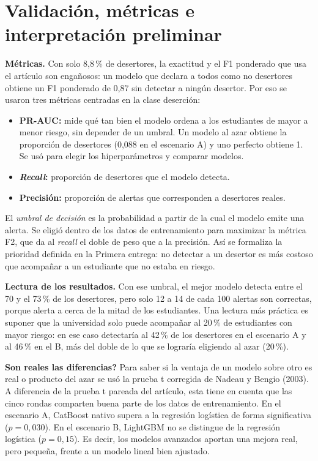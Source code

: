 \documentclass[11pt,a4paper]{article}
\begin{document}
\section{Validación, métricas e interpretación preliminar}

\textbf{Métricas.} Con solo 8,8\,\% de desertores, la exactitud y el F1 ponderado que usa el artículo son engañosos: un modelo que declara a todos como no desertores obtiene un F1 ponderado de 0,87 sin detectar a ningún desertor. Por eso se usaron tres métricas centradas en la clase deserción:
\begin{itemize}[leftmargin=1.2em,itemsep=1pt,topsep=2pt]
\item \textbf{PR-AUC:} mide qué tan bien el modelo ordena a los estudiantes de mayor a menor riesgo, sin depender de un umbral. Un modelo al azar obtiene la proporción de desertores (0,088 en el escenario A) y uno perfecto obtiene 1. Se usó para elegir los hiperparámetros y comparar modelos.
\item \textbf{\textit{Recall}:} proporción de desertores que el modelo detecta.
\item \textbf{Precisión:} proporción de alertas que corresponden a desertores reales.
\end{itemize}
El \emph{umbral de decisión} es la probabilidad a partir de la cual el modelo emite una alerta. Se eligió dentro de los datos de entrenamiento para maximizar la métrica F2, que da al \textit{recall} el doble de peso que a la precisión. Así se formaliza la prioridad definida en la Primera entrega: no detectar a un desertor es más costoso que acompañar a un estudiante que no estaba en riesgo.

\textbf{Lectura de los resultados.} Con ese umbral, el mejor modelo detecta entre el 70 y el 73\,\% de los desertores, pero solo 12 a 14 de cada 100 alertas son correctas, porque alerta a cerca de la mitad de los estudiantes. Una lectura más práctica es suponer que la universidad solo puede acompañar al 20\,\% de estudiantes con mayor riesgo: en ese caso detectaría al 42\,\% de los desertores en el escenario A y al 46\,\% en el B, más del doble de lo que se lograría eligiendo al azar (20\,\%).

\textbf{\textquestiondown{}Son reales las diferencias?} Para saber si la ventaja de un modelo sobre otro es real o producto del azar se usó la prueba t corregida de Nadeau y Bengio (2003). A diferencia de la prueba t pareada del artículo, esta tiene en cuenta que las cinco rondas comparten buena parte de los datos de entrenamiento. En el escenario A, CatBoost nativo supera a la regresión logística de forma significativa ($p=0{,}030$). En el escenario B, LightGBM no se distingue de la regresión logística ($p=0{,}15$). Es decir, los modelos avanzados aportan una mejora real, pero pequeña, frente a un modelo lineal bien ajustado.
\end{document}
